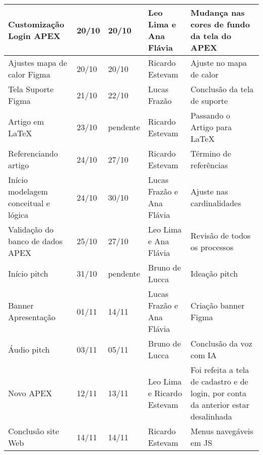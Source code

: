\documentclass[
landscape,
  a4paper,%
  12pt,%
  english,%
  brazilian,%
]{article}
\begin{document}
\begin{table}[]
{\begin{tabular}{|l|l|l|l|l|}
Customização Login APEX             & 20/10 & 20/10 & Leo Lima e Ana Flávia & Mudança nas cores de fundo da tela do APEX \\ \hline
Ajustes mapa de calor Figma         & 20/10 & 20/10 & Ricardo Estevam & Ajuste no mapa de calor \\ \hline
Tela Suporte Figma                  & 21/10 & 22/10 & Lucas Frazão & Conclusão da tela de suporte \\ \hline
Artigo em LaTeX                     & 23/10 & pendente & Ricardo Estevam & Passando o Artigo para LaTeX \\ \hline
Referenciando artigo                & 24/10 & 27/10 & Ricardo Estevam & Término de referências \\ \hline
Início modelagem conceitual e lógica& 24/10 & 30/10 & Lucas Frazão e Ana Flávia & Ajuste nas cardinalidades \\ \hline
Validação do banco de dados APEX    & 25/10 & 27/10 & Leo Lima e Ana Flávia & Revisão de todos os processos \\ \hline
Início pitch                        & 31/10 & pendente & Bruno de Lucca & Ideação pitch \\ \hline
Banner Apresentação                 & 01/11 & 14/11 & Lucas Frazão e Ana Flávia & Criação banner Figma \\ \hline
Áudio pitch                         & 03/11 & 05/11 & Bruno de Lucca & Conclusão da voz com IA \\ \hline
Novo APEX                           & 12/11 & 13/11 & Leo Lima e Ricardo Estevam & Foi refeita a tela de cadastro e de login, por conta da anterior estar desalinhada \\ \hline
Conclusão site Web                  & 14/11 & 14/11 & Ricardo Estevam & Menus navegáveis em JS \\ \hline
\end{tabular}
}
\end{table}
\end{document}
